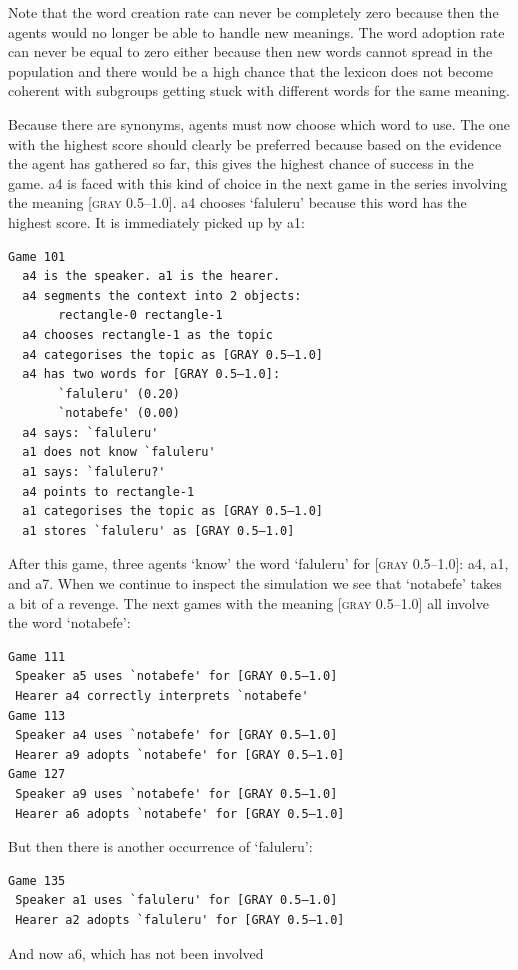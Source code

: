 Note that the word creation 
rate can never be completely zero because then the agents
would no longer be able to handle new meanings. The word 
adoption rate can never be equal to zero either because then 
new words cannot spread in the population and there
would be a high chance that the lexicon does not become coherent
with subgroups getting stuck with different
words for the same meaning. 

Because there are synonyms, agents must now choose
which word to use. The one with the highest
score should clearly be preferred because based on the
evidence the agent has gathered so far, this
gives the highest chance of success in the game. {\bfshape  a4}
is faced with this kind of choice in 
the next game in the series involving the meaning
{}[\textsc{gray} 0.5–1.0]. {\bfshape  a4} chooses `faluleru' because this 
word has the highest score. It is immediately picked up by 
{\bfshape  a1}: 
\clearpage
\begin{verbatim}
Game 101
  a4 is the speaker. a1 is the hearer. 
  a4 segments the context into 2 objects: 
       rectangle-0 rectangle-1
  a4 chooses rectangle-1 as the topic 
  a4 categorises the topic as [GRAY 0.5–1.0]
  a4 has two words for [GRAY 0.5–1.0]:
       `faluleru' (0.20)
       `notabefe' (0.00)
  a4 says: `faluleru'
  a1 does not know `faluleru'
  a1 says: `faluleru?'
  a4 points to rectangle-1
  a1 categorises the topic as [GRAY 0.5–1.0]
  a1 stores `faluleru' as [GRAY 0.5–1.0]
\end{verbatim}
After this game, three agents `know' the word 
`faluleru' for [\textsc{gray} 0.5–1.0]: {\bfshape  a4}, {\bfshape  a1}, 
and {\bfshape  a7}. When we continue to inspect the
simulation we see that `notabefe' takes a bit of 
a revenge. The next games with the 
meaning [\textsc{gray} 0.5–1.0] all involve the word `notabefe': 
\begin{verbatim}
Game 111
 Speaker a5 uses `notabefe' for [GRAY 0.5–1.0]
 Hearer a4 correctly interprets `notabefe'
Game 113
 Speaker a4 uses `notabefe' for [GRAY 0.5–1.0]
 Hearer a9 adopts `notabefe' for [GRAY 0.5–1.0]
Game 127
 Speaker a9 uses `notabefe' for [GRAY 0.5–1.0]
 Hearer a6 adopts `notabefe' for [GRAY 0.5–1.0]
\end{verbatim}
But then there is another occurrence of `faluleru': 
\begin{verbatim}
Game 135 
 Speaker a1 uses `faluleru' for [GRAY 0.5–1.0]
 Hearer a2 adopts `faluleru' for [GRAY 0.5–1.0]
\end{verbatim}
And now {\bfshape  a6}, which has not been involved 
